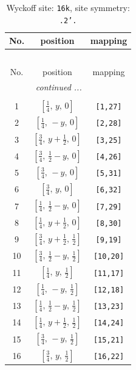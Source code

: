 \documentclass[fleqn,8pt]{jsarticle}
\begin{document}
\renewcommand{\arraystretch}{1.2}
\begin{longtable}{ccc}
\caption{Wyckoff site: {\tt 16k}, site symmetry: {\tt .2'.}}
 \\
 \hline \hline
No. & position & mapping \\ \hline \endfirsthead

\multicolumn{2}{l}{\tablename\ \thetable{}} \\
 \hline \hline
No. & position & mapping \\ \hline \endhead

 \hline \hline
\multicolumn{2}{r}{\footnotesize\it continued ...} \\ \endfoot

 \hline \hline
\multicolumn{2}{r}{} \\ \endlastfoot

1 & $\left[ \frac{1}{4},\, y,\, 0 \right]$ & {\tt [1,27]} \\ \hline
2 & $\left[ \frac{1}{4},\, - y,\, 0 \right]$ & {\tt [2,28]} \\ \hline
3 & $\left[ \frac{3}{4},\, y + \frac{1}{2},\, 0 \right]$ & {\tt [3,25]} \\ \hline
4 & $\left[ \frac{3}{4},\, \frac{1}{2} - y,\, 0 \right]$ & {\tt [4,26]} \\ \hline
5 & $\left[ \frac{3}{4},\, - y,\, 0 \right]$ & {\tt [5,31]} \\ \hline
6 & $\left[ \frac{3}{4},\, y,\, 0 \right]$ & {\tt [6,32]} \\ \hline
7 & $\left[ \frac{1}{4},\, \frac{1}{2} - y,\, 0 \right]$ & {\tt [7,29]} \\ \hline
8 & $\left[ \frac{1}{4},\, y + \frac{1}{2},\, 0 \right]$ & {\tt [8,30]} \\ \hline
9 & $\left[ \frac{3}{4},\, y + \frac{1}{2},\, \frac{1}{2} \right]$ & {\tt [9,19]} \\ \hline
10 & $\left[ \frac{3}{4},\, \frac{1}{2} - y,\, \frac{1}{2} \right]$ & {\tt [10,20]} \\ \hline
11 & $\left[ \frac{1}{4},\, y,\, \frac{1}{2} \right]$ & {\tt [11,17]} \\ \hline
12 & $\left[ \frac{1}{4},\, - y,\, \frac{1}{2} \right]$ & {\tt [12,18]} \\ \hline
13 & $\left[ \frac{1}{4},\, \frac{1}{2} - y,\, \frac{1}{2} \right]$ & {\tt [13,23]} \\ \hline
14 & $\left[ \frac{1}{4},\, y + \frac{1}{2},\, \frac{1}{2} \right]$ & {\tt [14,24]} \\ \hline
15 & $\left[ \frac{3}{4},\, - y,\, \frac{1}{2} \right]$ & {\tt [15,21]} \\ \hline
16 & $\left[ \frac{3}{4},\, y,\, \frac{1}{2} \right]$ & {\tt [16,22]} \\
\end{longtable}
\end{document}

